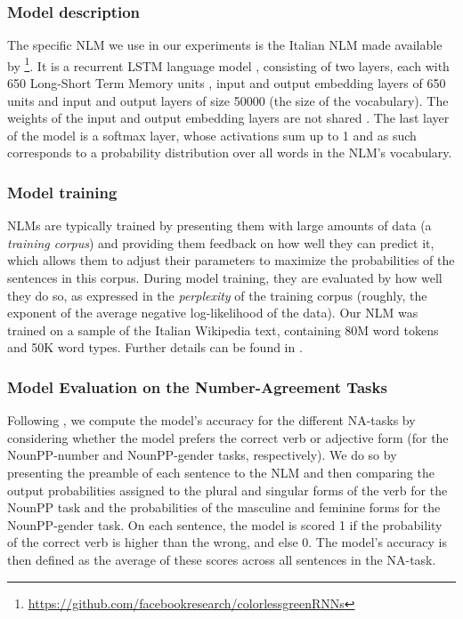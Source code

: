 \subsubsection{Model description}
The specific NLM we use in our experiments is the Italian NLM made available by \citet{Gulordava:etal:2018}\footnote{\url{https://github.com/facebookresearch/colorlessgreenRNNs}}.
It is a recurrent LSTM language model \citep{Graves:2012}, consisting of two layers, each with 650 Long-Short Term Memory units  \citep{Hochreiter:Schmidhuber:1997}, input and output embedding layers of 650 units and input and output layers of size 50000 (the size of the vocabulary). 
The weights of the input and output embedding layers are not shared \citep{press2016using}.
The last layer of the model is a softmax layer, whose activations sum up to 1 and as such corresponds to a probability distribution over all words in the NLM's vocabulary. 

\subsubsection{Model training}
NLMs are typically trained by presenting them with large amounts of data (a \emph{training corpus}) and providing them feedback on how well they can predict it, which allows them to adjust their parameters to maximize the probabilities of the sentences in this corpus.
During model training, they are evaluated by how well they do so, as expressed in the \emph{perplexity} of the training corpus (roughly, the exponent of the average negative log-likelihood of the data).
Our NLM was trained on a sample of the Italian Wikipedia text, containing 80M word tokens and 50K word types. Further details can be found in \citet{Gulordava:etal:2018}.


\subsubsection{Model Evaluation on the Number-Agreement Tasks}
Following \citet{Linzen:etal:2016}, we compute the model's accuracy for the different NA-tasks by considering whether the model prefers the correct verb or adjective form (for the NounPP-number and NounPP-gender tasks, respectively).
We do so by presenting the preamble of each sentence to the NLM and then comparing the output probabilities assigned to the plural and singular forms of the verb for the NounPP task and the probabilities of the masculine and feminine forms for the NounPP-gender task.
On each sentence, the model is scored 1 if the probability of the correct verb is higher than the wrong, and else 0. 
The model's accuracy is then defined as the average of these scores across all sentences in the NA-task. 


